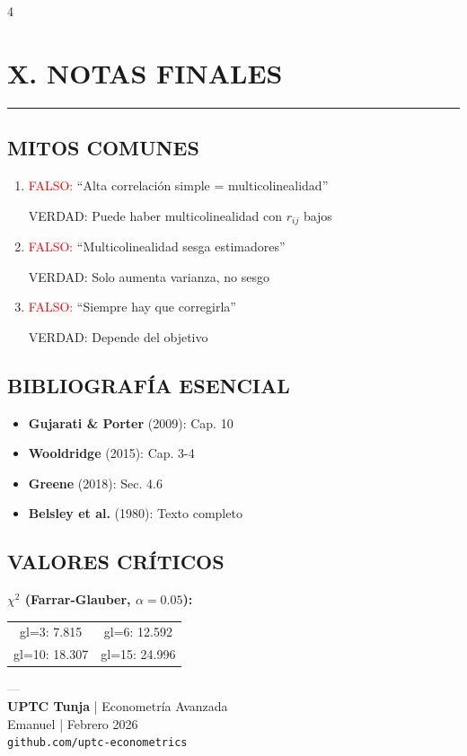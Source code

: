 \documentclass[6pt, landscape]{extarticle}
\newcommand{\sectionline}{%
  \nopagebreak\vspace{-4pt}\noindent\textcolor{GoldLeaf}{\rule{\linewidth}{1pt}}\par\vspace{2pt}%
}
\begin{document}
\begin{multicols*}{4}
\section{X. NOTAS FINALES}
\sectionline

\subsection{MITOS COMUNES}

\begin{enumerate}
    \item \textcolor{red}{FALSO:} ``Alta correlación simple = multicolinealidad''
    
    \textcolor{OliveGreen}{VERDAD:} Puede haber multicolinealidad con $r_{ij}$ bajos
    
    \item \textcolor{red}{FALSO:} ``Multicolinealidad sesga estimadores''
    
    \textcolor{OliveGreen}{VERDAD:} Solo aumenta varianza, no sesgo
    
    \item \textcolor{red}{FALSO:} ``Siempre hay que corregirla''
    
    \textcolor{OliveGreen}{VERDAD:} Depende del objetivo
\end{enumerate}

\subsection{BIBLIOGRAFÍA ESENCIAL}

\begin{itemize}
    \item \textbf{Gujarati \& Porter} (2009): Cap. 10
    \item \textbf{Wooldridge} (2015): Cap. 3-4
    \item \textbf{Greene} (2018): Sec. 4.6
    \item \textbf{Belsley et al.} (1980): Texto completo
\end{itemize}

\subsection{VALORES CRÍTICOS}

\textbf{$\chi^2$ (Farrar-Glauber, $\alpha=0.05$):}

{\tiny
\begin{tabular}{@{}cc@{}}
gl=3: 7.815 & gl=6: 12.592 \\
gl=10: 18.307 & gl=15: 24.996 \\
\end{tabular}
}

\vspace{6pt}

\begin{center}
{\scriptsize\sffamily
\textcolor{gray}{---}\\
\textbf{UPTC Tunja} | Econometría Avanzada\\
Emanuel | Febrero 2026\\
\texttt{github.com/uptc-econometrics}
}
\end{center}

\end{multicols*}
\end{document}

